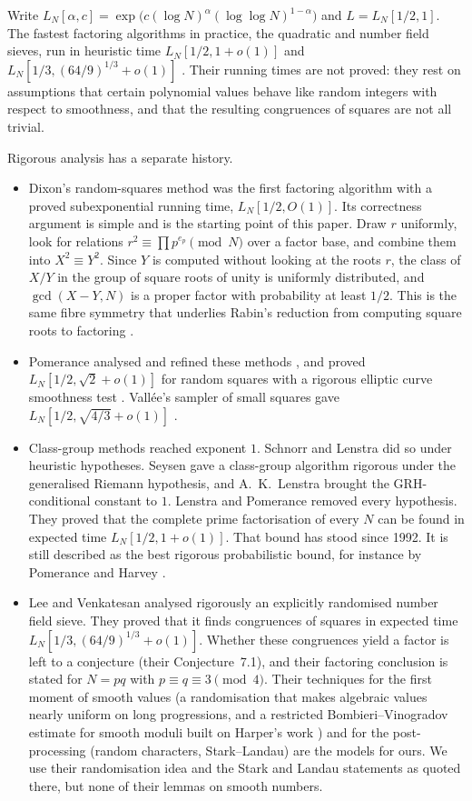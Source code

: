 \documentclass[11pt]{amsart}
\theoremstyle{definition}
\begin{document}
Write $L_N[\alpha,c]=\exp\bigl(c(\log N)^\alpha(\log\log N)^{1-\alpha}\bigr)$ and $L=L_N[1/2,1]$. The
fastest factoring algorithms in practice, the quadratic and number field sieves, run in heuristic time
$L_N[1/2,1+o(1)]$ and $L_N[1/3,(64/9)^{1/3}+o(1)]$
\cite{pomerance1982,lllm1990,blp1993}. Their running times are not proved: they rest on assumptions that
certain polynomial values behave like random integers with respect to smoothness, and that the
resulting congruences of squares are not all trivial.

Rigorous analysis has a separate history.
\begin{itemize}
\item Dixon's random-squares method \cite{dixon1981} was the first factoring algorithm with a proved
  subexponential running time, $L_N[1/2,O(1)]$. Its correctness argument is simple and is the starting point of
  this paper. Draw $r$ uniformly, look for relations $r^2\equiv\prod p^{e_p}\pmod N$ over a factor base,
  and combine them into $X^2\equiv Y^2$. Since $Y$ is computed without looking at the roots $r$, the
  class of $X/Y$ in the group of square roots of unity is uniformly distributed, and $\gcd(X-Y,N)$ is
  a proper factor with probability at least $1/2$. This is the same fibre symmetry that underlies
  Rabin's reduction from computing square roots to factoring \cite{rabin1979}.
\item Pomerance analysed and refined these methods \cite{pomerance1982}, and proved $L_N[1/2,\sqrt2+o(1)]$ for
  random squares with a rigorous elliptic curve smoothness test \cite{pomerance1987}. Vallée's
  sampler of small squares gave $L_N[1/2,\sqrt{4/3}+o(1)]$ \cite{vallee1991}.
\item Class-group methods reached exponent $1$. Schnorr and Lenstra \cite{schnorrlenstra1984} did so under
  heuristic hypotheses. Seysen \cite{seysen1987} gave a class-group algorithm rigorous under the generalised Riemann hypothesis, and A.~K.~Lenstra
  \cite{aklenstra1988} brought the GRH-conditional constant to $1$. Lenstra and Pomerance
  \cite{lp1992} removed every hypothesis. They proved that the complete prime factorisation of every
  $N$ can be found in expected time $L_N[1/2,1+o(1)]$. That bound has stood since 1992. It is still
  described as the best rigorous probabilistic bound, for instance by Pomerance \cite{pomerance2008}
  and Harvey \cite{harvey2021}.
\item Lee and Venkatesan \cite{lv2018} analysed rigorously an explicitly randomised number field sieve. They proved that it finds
  congruences of squares in expected time $L_N[1/3,(64/9)^{1/3}+o(1)]$. Whether these congruences yield
  a factor is left to a conjecture (their Conjecture~7.1), and their factoring conclusion is
  stated for $N=pq$ with $p\equiv q\equiv3\pmod 4$. Their techniques for the first moment of smooth
  values (a randomisation that makes algebraic values nearly uniform on long progressions, and a restricted
  Bombieri--Vinogradov estimate for smooth moduli built on Harper's work \cite{harper2012}) and for the post-processing
  (random characters, Stark--Landau) are the models for ours. We use their randomisation idea and the Stark and Landau
  statements as quoted there, but none of their lemmas on smooth numbers.
\end{itemize}
\end{document}
